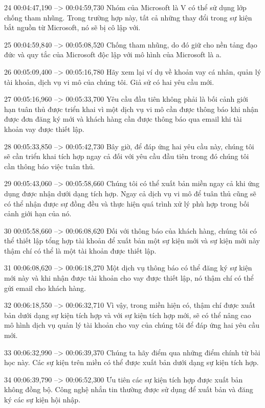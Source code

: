 24
00:04:47,190 --> 00:04:59,730
Nhóm của Microsoft là V có thể sử dụng lớp chống tham nhũng.  Trong trường hợp này, tất cả những thay đổi trong sự kiện bắt nguồn từ Microsoft, nó sẽ bị cô lập với.

25
00:04:59,840 --> 00:05:08,520
Chống tham nhũng, do đó giữ cho nền tảng đạo đức và quy tắc của Microsoft độc lập với mô hình của Microsoft là a.

26
00:05:09,400 --> 00:05:16,780
Hãy xem lại ví dụ về khoản vay cá nhân, quản lý tài khoản, dịch vụ vi mô của chúng tôi.  Giả sử có hai yêu cầu mới.

27
00:05:16,960 --> 00:05:33,700
Yêu cầu đầu tiên không phải là bối cảnh giới hạn tuân thủ được triển khai vì một dịch vụ vi mô cần được thông báo khi nhận được đơn đăng ký mới và khách hàng cần được thông báo qua email khi tài khoản vay được thiết lập.

28
00:05:33,850 --> 00:05:42,730
Bây giờ, để đáp ứng hai yêu cầu này, chúng tôi sẽ cần triển khai tích hợp ngay cả đối với yêu cầu đầu tiên trong đó chúng tôi cần thông báo việc tuân thủ.

29
00:05:43,060 --> 00:05:58,660
Chúng tôi có thể xuất bản miền ngay cả khi ứng dụng được nhận dưới dạng tích hợp.  Ngay cả dịch vụ vi mô để tuân thủ cũng sẽ có thể nhận được sự đồng đều và thực hiện quá trình xử lý phù hợp trong bối cảnh giới hạn của nó.

30
00:05:58,660 --> 00:06:08,620
Đối với thông báo của khách hàng, chúng tôi có thể thiết lập tổng hợp tài khoản để xuất bản một sự kiện mới và sự kiện mới này thậm chí có thể là một tài khoản được thiết lập.

31
00:06:08,620 --> 00:06:18,270
Một dịch vụ thông báo có thể đăng ký sự kiện mới này và khi nhận được tài khoản cho vay được thiết lập, nó thậm chí có thể gửi email cho khách hàng.

32
00:06:18,550 --> 00:06:32,710
Vì vậy, trong miền hiện có, thậm chí được xuất bản dưới dạng sự kiện tích hợp và với sự kiện tích hợp mới, sẽ có thể nâng cao mô hình dịch vụ quản lý tài khoản cho vay của chúng tôi để đáp ứng hai yêu cầu mới.

33
00:06:32,990 --> 00:06:39,370
Chúng ta hãy điểm qua những điểm chính từ bài học này.  Các sự kiện trên miền có thể được xuất bản dưới dạng sự kiện tích hợp.

34
00:06:39,790 --> 00:06:52,300
Ưu tiên các sự kiện tích hợp được xuất bản không đồng bộ.  Công nghệ nhắn tin thường được sử dụng để xuất bản và đăng ký các sự kiện hội nhập.

